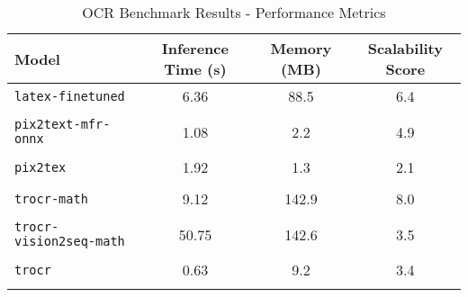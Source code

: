 \begin{table}[htbp]
\centering
\caption{OCR Benchmark Results - Performance Metrics}
\label{tab:ocr_benchmark_performance}
\begin{tabular}{|l|c|c|c|}
\hline
\textbf{Model} & \textbf{Inference Time (s)} & \textbf{Memory (MB)} & \textbf{Scalability Score} \\
\hline
\texttt{latex-finetuned} & 6.36 & 88.5 & 6.4 \\\\
\hline
\texttt{pix2text-mfr-onnx} & 1.08 & 2.2 & 4.9 \\\\
\hline
\texttt{pix2tex} & 1.92 & 1.3 & 2.1 \\\\
\hline
\texttt{trocr-math} & 9.12 & 142.9 & 8.0 \\\\
\hline
\texttt{trocr-vision2seq-math} & 50.75 & 142.6 & 3.5 \\\\
\hline
\texttt{trocr} & 0.63 & 9.2 & 3.4 \\\\
\hline
\end{tabular}
\end{table}


